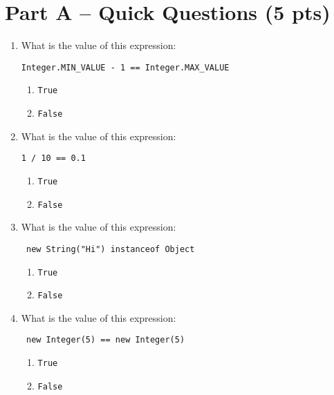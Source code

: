 \documentclass[S17-Final.tex]{subfiles}
\begin{document}
\section*{Part A -- Quick Questions (5 pts)}
\begin{enumerate}
\label{sec:one}

\item What is the value of this expression:
\begin{lstlisting}
Integer.MIN_VALUE - 1 == Integer.MAX_VALUE 
\end{lstlisting}

\begin{enumerate}
\item  \texttt{True} \ifdraft \Ans \fi 
\item  \texttt{False}
\end{enumerate}

\item What is the value of this expression: 
\begin{lstlisting}
1 / 10 == 0.1
\end{lstlisting}

\begin{enumerate}
\item  \texttt{True}
\item  \texttt{False}  \ifdraft \Ans \fi 
\end{enumerate}

\item What is the value of this expression:
\begin{lstlisting}
 new String("Hi") instanceof Object
\end{lstlisting}

\begin{enumerate}
\item  \texttt{True} \ifdraft \Ans \fi 
\item  \texttt{False}  
\end{enumerate}

\item What is the value of this expression:
\begin{lstlisting}
 new Integer(5) == new Integer(5)
\end{lstlisting}

\begin{enumerate}
\item  \texttt{True}
\item  \texttt{False} \ifdraft \Ans \fi 
\end{enumerate}


\end{enumerate}
\end{document}
